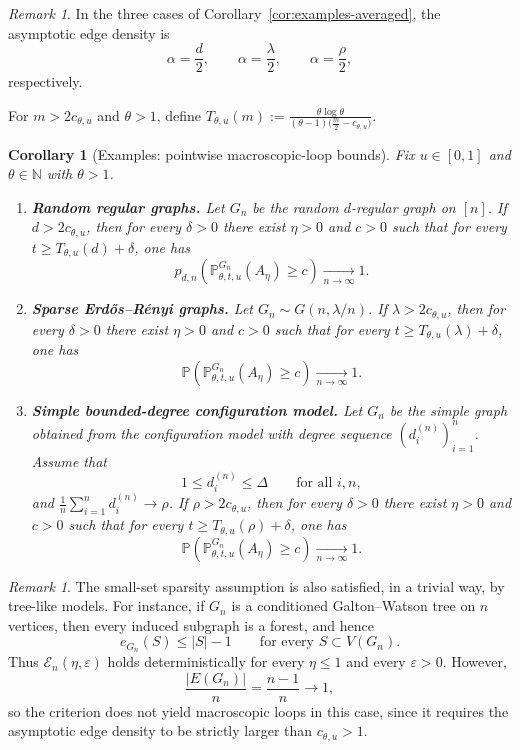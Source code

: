 \documentclass[11pt]{article}
\newtheorem{corollary}[theorem]{Corollary}
\theoremstyle{remark}
\newtheorem{remark}[theorem]{Remark}
\theoremstyle{plain}
\newcommand{\Pbb}{\mathbb{P}}
\newcommand{\1}{\mathbbm{1}}
\begin{document}
\begin{remark}
In the three cases of Corollary~\ref{cor:examples-averaged}, the asymptotic edge density is
\[
\alpha=\frac d2,\qquad \alpha=\frac{\lambda}{2},\qquad \alpha=\frac{\rho}{2},
\]
respectively.
\end{remark}
For \(m>2c_{\theta,u}\) and \(\theta>1\), define $T_{\theta,u}(m):=
\frac{\theta\log\theta}{(\theta-1)\bigl(\frac m2-c_{\theta,u}\bigr)}$.
\begin{corollary}[Examples: pointwise macroscopic-loop bounds]
\label{cor:examples-pointwise}
Fix \(u\in[0,1]\) and \(\theta\in\mathbb N\) with \(\theta>1\).

\begin{enumerate}[label=\textnormal{(\roman*)}]
    \item \textbf{Random regular graphs.}
    Let \(G_n\) be the random \(d\)-regular graph on \([n]\).
    If $d>2c_{\theta,u}$, then for every \(\delta>0\) there exist \(\eta>0\) and \(c>0\) such that for every $t\ge T_{\theta,u}(d)+\delta$, one has
    \[
    p_{d,n}\!\left(
    \Pbb^{G_n}_{\theta,t,u}(A_\eta)\ge c
    \right)\xrightarrow[n\to\infty]{}1.
    \]

    \item \textbf{Sparse Erd\H{o}s--R\'enyi graphs.}
    Let \(G_n\sim G(n,\lambda/n)\). If $\lambda>2c_{\theta,u}$, then for every \(\delta>0\) there exist \(\eta>0\) and \(c>0\) such that for every $t\ge T_{\theta,u}(\lambda)+\delta$, one has
    \[
    \Pbb\!\left(
    \Pbb^{G_n}_{\theta,t,u}(A_\eta)\ge c
    \right)\xrightarrow[n\to\infty]{}1.
    \]

    \item \textbf{Simple bounded-degree configuration model.}
    Let \(G_n\) be the simple graph obtained from the configuration model with
    degree sequence \((d_i^{(n)})_{i=1}^n\). Assume that
    \[
    1\le d_i^{(n)}\le \Delta
    \qquad\text{for all }i,n,
    \]
    and $\frac1n\sum_{i=1}^n d_i^{(n)}\to \rho$. If $\rho>2c_{\theta,u}$,
    then for every \(\delta>0\) there exist \(\eta>0\) and \(c>0\) such that for every  $t\ge T_{\theta,u}(\rho)+\delta$,
    one has
    \[
    \Pbb\!\left(
    \Pbb^{G_n}_{\theta,t,u}(A_\eta)\ge c
    \right)\xrightarrow[n\to\infty]{}1.
    \]
\end{enumerate}
\end{corollary}

\begin{remark}
The small-set sparsity assumption is also satisfied, in a trivial way, by tree-like models.
For instance, if \(G_n\) is a conditioned Galton--Watson tree on \(n\) vertices, then every
induced subgraph is a forest, and hence
\[
e_{G_n}(S)\le |S|-1
\qquad\text{for every }S\subset V(G_n).
\]
Thus \(\mathcal E_n(\eta,\varepsilon)\) holds deterministically for every \(\eta\le 1\) and every
\(\varepsilon>0\). However,
\[
\frac{|E(G_n)|}{n}=\frac{n-1}{n}\to 1,
\]
so the criterion does not yield macroscopic loops in this case, since it requires the asymptotic
edge density to be strictly larger than \(c_{\theta,u}>1\).
\end{remark}
\end{document}
